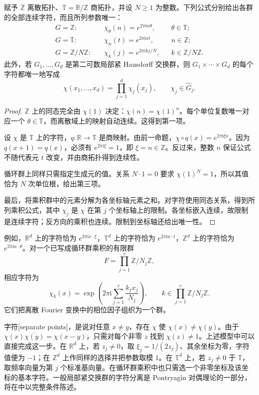 \begin{proposition}[整数、圆周和循环群的字符]
\label{b2:prop:I3-model-duals}
赋予 \(\mathbb Z\) 离散拓扑、\(\mathbb T=\mathbb R/\mathbb Z\) 商拓扑，并设 \(N\ge1\) 为整数。下列公式分别给出各群的全部连续字符，而且所列参数唯一：
\begin{align*}
 G=\mathbb Z:&\quad \chi_\theta(n)=e^{2\pi\mathrm in\theta},
     &&\theta\in\mathbb T;\\
 G=\mathbb T:&\quad \chi_n(t)=e^{2\pi\mathrm int},
     &&n\in\mathbb Z;\\
 G=\mathbb Z/N\mathbb Z:&\quad \chi_k(j)=e^{2\pi\mathrm ikj/N},
     &&k\in\mathbb Z/N\mathbb Z.
\end{align*}
此外，若 \(G_1,\ldots,G_d\) 是第二可数局部紧 Hausdorff 交换群，则 \(G_1\times\cdots\times G_d\) 的每个字符都唯一地写成
\[
 \chi(x_1,\ldots,x_d)=\prod_{j=1}^d\chi_j(x_j),\qquad
 \chi_j\in\widehat G_j.
\]
\end{proposition}
\begin{proof}
\(\mathbb Z\) 上的同态完全由 \(\chi(1)\) 决定：\(\chi(n)=\chi(1)^n\)。每个单位复数唯一对应一个 \(\theta\in\mathbb T\)，而离散域上的映射自动连续。这得到第一项。

设 \(\chi\) 是 \(\mathbb T\) 上的字符，\(q:\mathbb R\to\mathbb T\) 是商映射。由前一命题，\(\chi\circ q(x)=e^{2\pi\mathrm i\xi x}\)。因为 \(q(x+1)=q(x)\)，必须有 \(e^{2\pi\mathrm i\xi}=1\)，即 \(\xi=n\in\mathbb Z\)。反过来，整数 \(n\) 保证公式不随代表元 \(t\) 改变，并由商拓扑得到连续性。

循环群上同样只需指定生成元的值。关系 \(N\cdot1=0\) 要求 \(\chi(1)^N=1\)，所以其值恰为 \(N\) 次单位根，给出第三项。

最后，将乘积群中的元素分解为各坐标轴元素之和。对字符使用同态关系，得到所列乘积公式，其中 \(\chi_j\) 是 \(\chi\) 在第 \(j\) 个坐标轴上的限制。各坐标嵌入连续，故限制是连续字符；反方向的乘积也连续。限制到坐标轴还给出唯一性。
\end{proof}

例如，\(\mathbb R^d\) 上的字符恰为 \(e^{2\pi\mathrm ix\cdot\xi}\)，\(\mathbb T^d\) 上的字符恰为 \(e^{2\pi\mathrm in\cdot t}\)，\(\mathbb Z^d\) 上的字符恰为 \(e^{2\pi\mathrm in\cdot\theta}\)。对一个已写成循环群乘积的有限群
\[
 F=\prod_{j=1}^r\mathbb Z/N_j\mathbb Z,
\]
相应字符为
\[
 \chi_k(x)=\exp\left(2\pi\mathrm i\sum_{j=1}^r\frac{k_jx_j}{N_j}\right),
 \qquad k\in\prod_{j=1}^r\mathbb Z/N_j\mathbb Z.
\]
它们把离散 Fourier 变换中的相位因子组织为一个群。

字符[separate points]，是说对任意 \(x\ne y\)，存在 \(\chi\) 使 \(\chi(x)\ne\chi(y)\)。由于 \(\chi(x)\overline{\chi(y)}=\chi(x-y)\)，只需对每个非零 \(z\) 找到 \(\chi(z)\ne1\)。上述模型中可以直接完成这一步。在 \(\mathbb R^d\) 上，若 \(z_j\ne0\)，取 \(\xi_j=1/(2z_j)\)、其余坐标为零，字符值便为 \(-1\)；在 \(\mathbb Z^d\) 上作同样的选择并把参数取模 \(1\)。在 \(\mathbb T^d\) 上，若 \(z_j\ne0\) 于 \(\mathbb T\)，取频率向量为第 \(j\) 个标准基向量。在循环群乘积中也只需选一个非零坐标及该坐标的基本字符。一般局部紧交换群的字符分离是 Pontryagin 对偶理论的一部分，将在中以完整条件陈述。

